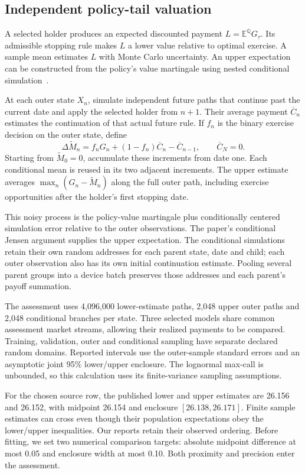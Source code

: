 \documentclass[8pt]{strategynet-journal}
\newcommand{\E}{\mathbb E}
\newcommand{\Q}{\mathbb Q}
\begin{document}
\begin{SNcolumns}
\section{Independent policy-tail valuation}
A selected holder produces an expected discounted payment
$L=\E^{\Q}G_{\tau}$. Its admissible stopping rule makes $L$ a lower value
relative to optimal exercise. A sample mean estimates $L$ with Monte Carlo
uncertainty. An upper expectation can be constructed from the policy's value
martingale using nested conditional simulation~\cite{stopping,american}.

At each outer state $X_n$, simulate independent future paths that continue
past the current date and apply the selected holder from $n+1$. Their average
payment $\overline C_n$ estimates the continuation of that actual future rule.
If $f_n$ is the binary exercise decision on the outer state, define
\[
 \Delta\widetilde M_n=f_nG_n+(1-f_n)\overline C_n-\overline C_{n-1},
 \qquad \overline C_N=0.
\]
Starting from $\widetilde M_0=0$, accumulate these increments from date one.
Each conditional mean is reused in its two adjacent increments. The upper
estimate averages $\max_n(G_n-\widetilde M_n)$ along the full outer path,
including exercise opportunities after the holder's first stopping date.

This noisy process is the policy-value martingale plus conditionally centered
simulation error relative to the outer observations. The paper's conditional
Jensen argument supplies the upper expectation. The conditional simulations
retain their own random addresses for each parent state, date and child;
each outer observation also has its own initial continuation estimate.
Pooling several parent groups into a device batch preserves those addresses
and each parent's payoff summation.

The assessment uses 4,096,000 lower-estimate paths, 2,048 upper outer paths and
2,048 conditional branches per state. Three selected models share common
assessment market streams, allowing their realized payments to be compared.
Training, validation, outer and conditional sampling have separate declared
random domains. Reported intervals use the outer-sample standard errors and
an asymptotic joint 95\% lower/upper enclosure. The lognormal max-call is
unbounded, so this calculation uses its finite-variance sampling assumptions.

For the chosen source row, the published lower and upper estimates are 26.156
and 26.152, with midpoint 26.154 and enclosure $[26.138,26.171]$. Finite
sample estimates can cross even though their population expectations obey
the lower/upper inequalities. Our reports retain their observed ordering.
Before fitting, we set two numerical comparison targets: absolute midpoint
difference at most 0.05 and enclosure width at most 0.10. Both proximity and
precision enter the assessment.


\end{SNcolumns}
\end{document}
